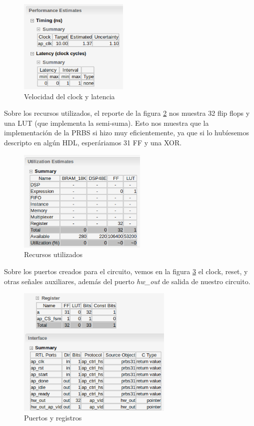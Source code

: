 \begin{figure}[!h]
\centering
\includegraphics[height=4.5cm]{figuras/performancePRBS31}
\caption{Velocidad del clock y latencia}
\label{fig:performance31}
\end{figure}

Sobre los recursos utilizados, el reporte de la figura \ref{fig:utilization31} nos muestra 32 flip flops y una LUT (que implementa la semi-suma). Esto nos muestra que la implementación de la PRBS si hizo muy eficientemente, ya que si lo hubíesemos descripto en algún HDL, esperáriamos 31 FF y una XOR.
 
\begin{figure}[!h]
\centering
\includegraphics[height=4.9cm]{figuras/utilizationPRBS31}
\caption{Recursos utilizados}
\label{fig:utilization31}

\end{figure}

Sobre los puertos creados para el circuito, vemos en la figura \ref{fig:registersAndPortsPRBS31} el clock, reset, y otras señales auxiliares, además del puerto \emph{hw\_out} de salida de nuestro circuito.

\begin{figure}[!h]
\centering
\includegraphics[height=6.2cm]{figuras/registersAndPortsPRBS31}
\caption{Puertos y registros}
\label{fig:registersAndPortsPRBS31}
\end{figure}

